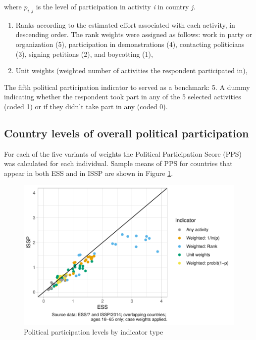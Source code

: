 \documentclass[12pt,]{article}
\providecommand{\tightlist}{%
  \setlength{\itemsep}{0pt}\setlength{\parskip}{0pt}}
\begin{document}
where \(p_{i,j}\) is the level of participation in activity \emph{i} in country \emph{j}.

\begin{enumerate}
\def\labelenumi{\arabic{enumi}.}
\setcounter{enumi}{2}
\tightlist
\item
  Ranks according to the estimated effort associated with each activity, in descending order. The rank weights were assigned as follows: work in party or organization (5), participation in demonstrations (4), contacting politicians (3), signing petitions (2), and boycotting (1),\\
\item
  Unit weights (weighted number of activities the respondent participated in),
\end{enumerate}

The fifth political participation indicator to served as a benchmark:
5. A dummy indicating whether the respondent took part in any of the 5 selected activities (coded 1) or if they didn't take part in any (coded 0).

\hypertarget{country-levels-of-overall-political-participation}{%
\subsection{Country levels of overall political participation}\label{country-levels-of-overall-political-participation}}

For each of the five variants of weights the Political Participation Score (PPS) was calculated for each individual. Sample means of PPS for countries that appear in both ESS and in ISSP are shown in Figure \ref{fig:part-level-dot-plot}.

\begin{figure}[H]

{\centering \includegraphics{paper_files/figure-latex/part-level-dot-plot-1} 

}

\caption{Political participation levels by indicator type}\label{fig:part-level-dot-plot}
\end{figure}
\end{document}
